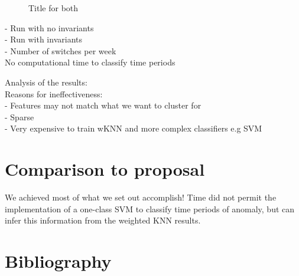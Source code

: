 \documentclass[11pt,letterpaper]{article}
\begin{document}
\begin{figure}
  \centering
  \hfill
  \hfill
  \hfill
  \hfill
  \caption{Title for both}
\end{figure}

- Run with no invariants \\

- Run with invariants \\

- Number of switches per week \\


No computational time to classify time periods

Analysis of the results: \\

Reasons for ineffectiveness: \\

- Features may not match what we want to cluster for \\
- Sparse \\ 
- Very expensive to train wKNN and more complex classifiers e.g SVM \\

\section{Comparison to proposal}
We achieved most of what we set out accomplish! Time did not permit the implementation of
a one-class SVM to classify time periods of anomaly, but can infer this information from
the weighted KNN results.

\section*{Bibliography}


%
%
\end{document}
